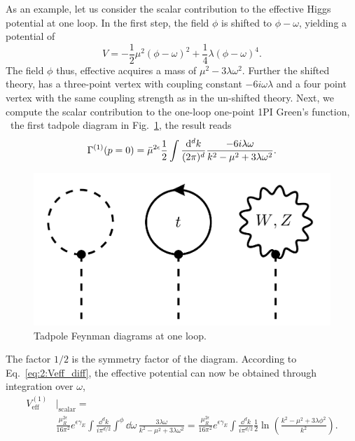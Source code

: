 As an example, let us consider the scalar contribution to the effective Higgs potential at one loop. In the first step, the field $\phi$ is shifted to $\phi - \omega$, yielding a potential of
\begin{equation}
V = -\frac{1}{2} \mu^2 (\phi - \omega)^2 + \frac{1}{4} \lambda (\phi - \omega)^4.
\end{equation}
The field $\phi$ thus, effective acquires a mass of $\mu^2 - 3 \lambda \omega^2$. Further the shifted theory, has a three-point vertex with coupling constant $- 6i\omega \lambda$ and a four point vertex with the same coupling strength as in the un-shifted theory. Next, we compute the scalar contribution to the one-loop one-point \acs{1PI} Green's function, \ie\ the first tadpole diagram in Fig.~\ref{fig:2:tadpoles}, the result reads
\begin{equation}
\Gamma^{(1)} (p = 0) = \bar{\mu}^{2 \epsilon} \frac{1}{2} \int \frac{\mathrm{d}^d k}{(2 \pi)^d} \frac{-6i \lambda \omega}{k^2 - \mu^2 + 3 \lambda \omega^2}.
\end{equation}
\begin{figure}[h]
\centering
\includegraphics[scale=0.25]{Images/tadpoles.pdf}
\caption{Tadpole Feynman diagrams at one loop.}
\label{fig:2:tadpoles}
\end{figure}
The factor $1/2$ is the symmetry factor of the diagram. According to Eq.~\eqref{eq:2:Veff_diff}, the effective potential can now be obtained through integration over $\omega$,
\begin{equation}
\begin{split}
V_\text{eff}^{(1)} &\big \vert_{\text{scalar}} =  \\
&\frac{\mu_R^{2 \epsilon}}{16 \pi^2} e^{\epsilon \gamma_E} \int \frac{\dd^d k}{i \pi^{d/2}} \int^{\phi} \dd \omega\, \frac{3 \lambda \omega}{k^2 - \mu^2 + 3 \lambda \omega^2} = \frac{\mu_R^{2 \epsilon}}{16 \pi^2} e^{\epsilon \gamma_E} \int \frac{\dd^d k}{i \pi^{d/2}} \frac{1}{2} \ln\! \left( \frac{k^2 - \mu^2 + 3 \lambda \phi^2}{k^2} \right).
\end{split}
\end{equation}
